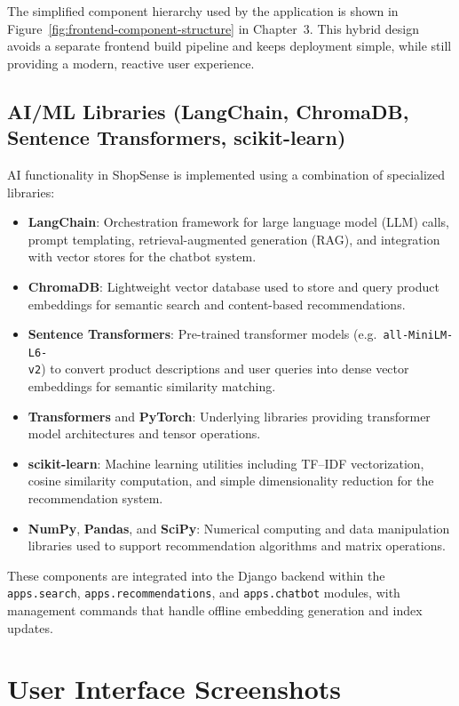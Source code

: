 The simplified component hierarchy used by the application is shown in Figure~\ref{fig:frontend-component-structure} in Chapter~3. This hybrid design avoids a separate frontend build pipeline and keeps deployment simple, while still providing a modern, reactive user experience.

\subsection{AI/ML Libraries (LangChain, ChromaDB, Sentence Transformers, scikit-learn)}

AI functionality in ShopSense is implemented using a combination of specialized libraries:

\begin{itemize}
  \item \textbf{LangChain}: Orchestration framework for large language model (LLM) calls, prompt templating, retrieval-augmented generation (RAG), and integration with vector stores for the chatbot system.
  \item \textbf{ChromaDB}: Lightweight vector database used to store and query product embeddings for semantic search and content-based recommendations.
  \item \textbf{Sentence Transformers}: Pre-trained transformer models (e.g.\ \texttt{all-MiniLM-L6-\\v2}) to convert product descriptions and user queries into dense vector embeddings for semantic similarity matching.
  \item \textbf{Transformers} and \textbf{PyTorch}: Underlying libraries providing transformer model architectures and tensor operations.
  \item \textbf{scikit-learn}: Machine learning utilities including TF--IDF vectorization, cosine similarity computation, and simple dimensionality reduction for the recommendation system.
  \item \textbf{NumPy}, \textbf{Pandas}, and \textbf{SciPy}: Numerical computing and data manipulation libraries used to support recommendation algorithms and matrix operations.
\end{itemize}

These components are integrated into the Django backend within the \texttt{apps.search}, \texttt{apps.recommendations}, and \texttt{apps.chatbot} modules, with management commands that handle offline embedding generation and index updates.

\section{User Interface Screenshots}

